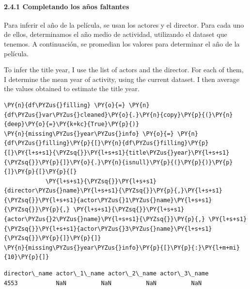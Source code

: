 \paragraph{2.4.1 Completando los años
faltantes}\label{completando-los-auxf1os-faltantes}

Para inferir el año de la película, se usan los actores y el director.
Para cada uno de ellos, determinamos el año medio de actividad,
utilizando el dataset que tenemos. A continuación, se promedian los
valores para determinar el año de la película.

To infer the title year, I use the list of actors and the director. For
each of them, I determine the mean year of activity, using the current
dataset. I then average the values obtained to estimate the title year.

    \begin{tcolorbox}[breakable, size=fbox, boxrule=1pt, pad at break*=1mm,colback=cellbackground, colframe=cellborder]
\begin{Verbatim}[commandchars=\\\{\}]
\PY{n}{df\PYZus{}filling} \PY{o}{=} \PY{n}{df\PYZus{}var\PYZus{}cleaned}\PY{o}{.}\PY{n}{copy}\PY{p}{(}\PY{n}{deep}\PY{o}{=}\PY{k+kc}{True}\PY{p}{)}
\PY{n}{missing\PYZus{}year\PYZus{}info} \PY{o}{=} \PY{n}{df\PYZus{}filling}\PY{p}{[}\PY{n}{df\PYZus{}filling}\PY{p}{[}\PY{l+s+s1}{\PYZsq{}}\PY{l+s+s1}{title\PYZus{}year}\PY{l+s+s1}{\PYZsq{}}\PY{p}{]}\PY{o}{.}\PY{n}{isnull}\PY{p}{(}\PY{p}{)}\PY{p}{]}\PY{p}{[}\PY{p}{[}
            \PY{l+s+s1}{\PYZsq{}}\PY{l+s+s1}{director\PYZus{}name}\PY{l+s+s1}{\PYZsq{}}\PY{p}{,}\PY{l+s+s1}{\PYZsq{}}\PY{l+s+s1}{actor\PYZus{}1\PYZus{}name}\PY{l+s+s1}{\PYZsq{}}\PY{p}{,} \PY{l+s+s1}{\PYZsq{}}\PY{l+s+s1}{actor\PYZus{}2\PYZus{}name}\PY{l+s+s1}{\PYZsq{}}\PY{p}{,} \PY{l+s+s1}{\PYZsq{}}\PY{l+s+s1}{actor\PYZus{}3\PYZus{}name}\PY{l+s+s1}{\PYZsq{}}\PY{p}{]}\PY{p}{]}
\PY{n}{missing\PYZus{}year\PYZus{}info}\PY{p}{[}\PY{p}{:}\PY{l+m+mi}{10}\PY{p}{]}
\end{Verbatim}
\end{tcolorbox}

            \begin{tcolorbox}[breakable, boxrule=.5pt, size=fbox, pad at break*=1mm, opacityfill=0]
\begin{Verbatim}[commandchars=\\\{\}]
     director\_name actor\_1\_name actor\_2\_name actor\_3\_name
4553           NaN          NaN          NaN          NaN
\end{Verbatim}
\end{tcolorbox}
        
